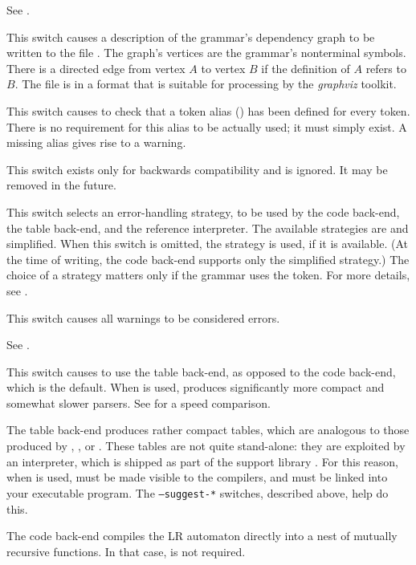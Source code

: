 \documentclass[onecolumn,11pt,nocopyrightspace,preprint]{sigplanconf}
\begin{document}
\docswitch{\orawdepend} See .

\docswitch{\oreferencegraph} This switch causes a description of the grammar's
dependency graph to be written to the file \dott. The graph's
vertices are the grammar's nonterminal symbols. There is a directed edge from
vertex $A$ to vertex $B$ if the definition of $A$ refers to $B$. The file is
in a format that is suitable for processing by the \emph{graphviz} toolkit.

\docswitch{\orequirealiases} This switch causes \menhir to check that a token
alias () has been defined for every token. There is no
requirement for this alias to be actually used; it must simply exist. A
missing alias gives rise to a warning.

 This switch exists only for
backwards compatibility and is ignored. It may be removed in the future.

 This switch selects an error-handling
strategy, to be used by the code back-end, the table back-end, and the
reference interpreter. The available strategies are \legacy and simplified.
When this switch is omitted, the \legacy strategy is used, if it is available.
(At the time of writing, the code back-end supports only the simplified
strategy.) The choice of a strategy matters only if the grammar uses the
\error token. For more details, see .

\docswitch{\ostrict} This switch causes all warnings to be considered errors.

 See .

\docswitch{\otable} This switch causes \menhir to use the table back-end, as
opposed to the code back-end, which is the default. When \otable is used,
\menhir produces significantly more compact and somewhat slower parsers. See
 for a speed comparison.

The table back-end produces rather compact tables, which are analogous
to those produced by \yacc, \bison, or \ocamlyacc. These tables are not quite
stand-alone: they are exploited by an interpreter, which is shipped as part of
the support library \menhirlib. For this reason, when \otable is used,
\menhirlib must be made visible to the \ocaml compilers, and must be linked
into your executable program. The \texttt{--suggest-*} switches, described
above, help do this.

The code back-end compiles the LR automaton directly into a nest of
mutually recursive \ocaml functions. In that case, \menhirlib is not required.
\end{document}
